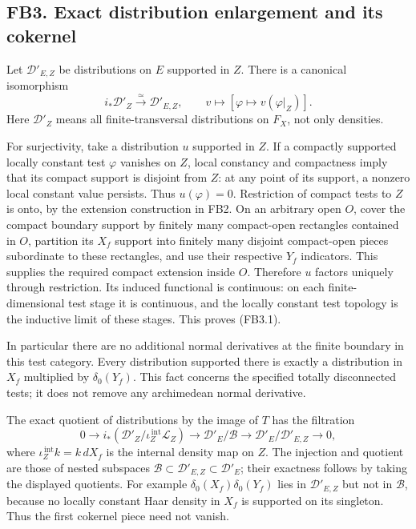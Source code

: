 \subsection{FB3. Exact distribution enlargement and its
cokernel}\label{fb3.-exact-distribution-enlargement-and-its-cokernel}

Let \(\mathscr D'_{E,Z}\) be distributions on \(E\) supported in \(Z\).
There is a canonical isomorphism \[
i_*\mathscr D'_Z\xrightarrow{\ \simeq\ }\mathscr D'_{E,Z},
\qquad
v\longmapsto[\varphi\mapsto v(\varphi|_Z)].
\tag{FB3.1}
\] Here \(\mathscr D'_Z\) means all finite-transversal distributions on
\(F_X\), not only densities.

For surjectivity, take a distribution \(u\) supported in \(Z\). If a
compactly supported locally constant test \(\varphi\) vanishes on \(Z\),
local constancy and compactness imply that its compact support is
disjoint from \(Z\): at any point of its support, a nonzero local
constant value persists. Thus \(u(\varphi)=0\). Restriction of compact
tests to \(Z\) is onto, by the extension construction in FB2. On an
arbitrary open \(O\), cover the compact boundary support by finitely
many compact-open rectangles contained in \(O\), partition its \(X_f\)
support into finitely many disjoint compact-open pieces subordinate to
these rectangles, and use their respective \(Y_f\) indicators. This
supplies the required compact extension inside \(O\). Therefore \(u\)
factors uniquely through restriction. Its induced functional is
continuous: on each finite-dimensional test stage it is continuous, and
the locally constant test topology is the inductive limit of these
stages. This proves (FB3.1).

In particular there are no additional normal derivatives at the finite
boundary in this test category. Every distribution supported there is
exactly a distribution in \(X_f\) multiplied by \(\delta_0(Y_f)\). This
fact concerns the specified totally disconnected tests; it does not
remove any archimedean normal derivative.

The exact quotient of distributions by the image of \(T\) has the
filtration \[
0\longrightarrow
i_*(\mathscr D'_Z/\iota_Z^{\,\mathrm{int}}\mathscr L_Z)
\longrightarrow\mathscr D'_E/\mathscr B
\longrightarrow\mathscr D'_E/\mathscr D'_{E,Z}
\longrightarrow0,
\tag{FB3.2}
\] where \(\iota_Z^{\,\mathrm{int}}k=k\,dX_f\) is the internal density
map on \(Z\). The injection and quotient are those of nested subspaces
\(\mathscr B\subset\mathscr D'_{E,Z}\subset\mathscr D'_E\); their
exactness follows by taking the displayed quotients. For example
\(\delta_0(X_f)\delta_0(Y_f)\) lies in \(\mathscr D'_{E,Z}\) but not in
\(\mathscr B\), because no locally constant Haar density in \(X_f\) is
supported on its singleton. Thus the first cokernel piece need not
vanish.

